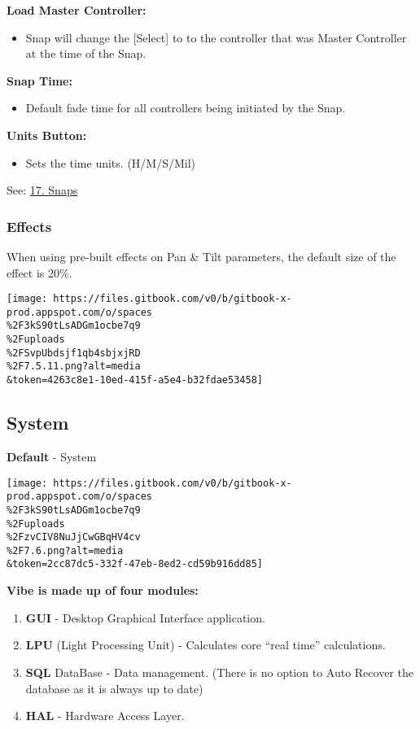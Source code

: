 \documentclass[
]{article}
\providecommand{\tightlist}{%
  \setlength{\itemsep}{0pt}\setlength{\parskip}{0pt}}
\begin{document}
\textbf{Load Master Controller:}

\begin{itemize}
\tightlist
\item
  Snap will change the {[}Select{]} to to the controller that was Master Controller at the time of the Snap.
\end{itemize}

\textbf{Snap Time:}

\begin{itemize}
\tightlist
\item
  Default fade time for all controllers being initiated by the Snap.
\end{itemize}

\textbf{Units Button:}

\begin{itemize}
\tightlist
\item
  Sets the time units. (H/M/S/Mil)
\end{itemize}

See: \href{https://vibemanual.compulite.com/snaps-snapshots.html}{17. Snaps}

\hypertarget{effects}{%
\subsubsection{Effects}\label{effects}}

When using pre-built effects on Pan \& Tilt parameters, the default size of the effect is 20\%.

\texttt{[image: https://files.gitbook.com/v0/b/gitbook-x-prod.appspot.com/o/spaces\\\%2F3kS90tLsADGm1ocbe7q9\\\%2Fuploads\\\%2FSvpUbdsjf1qb4sbjxjRD\\\%2F7.5.11.png?alt=media\\\&token=4263c8e1-10ed-415f-a5e4-b32fdae53458]}

\hypertarget{system}{%
\subsection{System}\label{system}}

\textbf{Default} - System

\texttt{[image: https://files.gitbook.com/v0/b/gitbook-x-prod.appspot.com/o/spaces\\\%2F3kS90tLsADGm1ocbe7q9\\\%2Fuploads\\\%2FzvCIV8NuJjCwGBqHV4cv\\\%2F7.6.png?alt=media\\\&token=2cc87dc5-332f-47eb-8ed2-cd59b916dd85]}

\textbf{Vibe is made up of four modules:}

\begin{enumerate}
\def\labelenumi{\arabic{enumi}.}
\item
  \textbf{GUI} - Desktop Graphical Interface application.
\item
  \textbf{LPU} (Light Processing Unit) - Calculates core ``real time'' calculations.
\item
  \textbf{SQL} DataBase - Data management. (There is no option to Auto Recover the database as it is always up to date)
\item
  \textbf{HAL} - Hardware Access Layer.
\end{enumerate}
\end{document}
